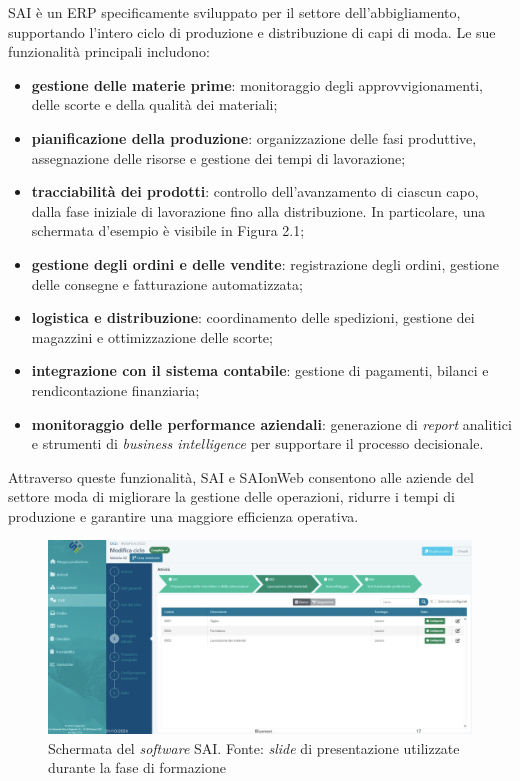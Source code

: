         \vspace{0.2 em}
        \noindent SAI è un ERP specificamente sviluppato per il settore dell'abbigliamento, supportando l’intero ciclo di produzione e distribuzione di capi di moda. Le sue funzionalità principali includono:  
        \begin{itemize}
            \item \textbf{gestione delle materie prime}: monitoraggio degli approvvigionamenti, delle scorte e della qualità dei materiali;
            \item \textbf{pianificazione della produzione}: organizzazione delle fasi produttive, assegnazione delle risorse e gestione dei tempi di lavorazione;
            \item \textbf{tracciabilità dei prodotti}: controllo dell’avanzamento di ciascun capo, dalla fase iniziale di lavorazione fino alla distribuzione. In particolare, una schermata d'esempio è visibile in Figura 2.1;
            \item \textbf{gestione degli ordini e delle vendite}: registrazione degli ordini, gestione delle consegne e fatturazione automatizzata;
            \item \textbf{logistica e distribuzione}: coordinamento delle spedizioni, gestione dei magazzini e ottimizzazione delle scorte;
            \item \textbf{integrazione con il sistema contabile}: gestione di pagamenti, bilanci e rendicontazione finanziaria;
            \item \textbf{monitoraggio delle performance aziendali}: generazione di \textit{report} analitici e strumenti di \textit{business intelligence} per supportare il processo decisionale.  
        \end{itemize}

        \vspace{0.2 em}
        \noindent Attraverso queste funzionalità, SAI e SAIonWeb consentono alle aziende del settore moda di migliorare la gestione delle operazioni, ridurre i tempi di produzione e garantire una maggiore efficienza operativa.

        \begin{figure}[H]
            \centering
            \includegraphics[width=1.0\linewidth]{BCS-Tessi//images/schermata_SAI.png}
            \caption[Schermata del \textit{software} SAI di SogeaSoft S.r.l.]{Schermata del \textit{software} SAI. Fonte: \textit{slide} di presentazione utilizzate durante la fase di formazione}
            \label{fig:screenSAI}
        \end{figure}
        \newpage
        
